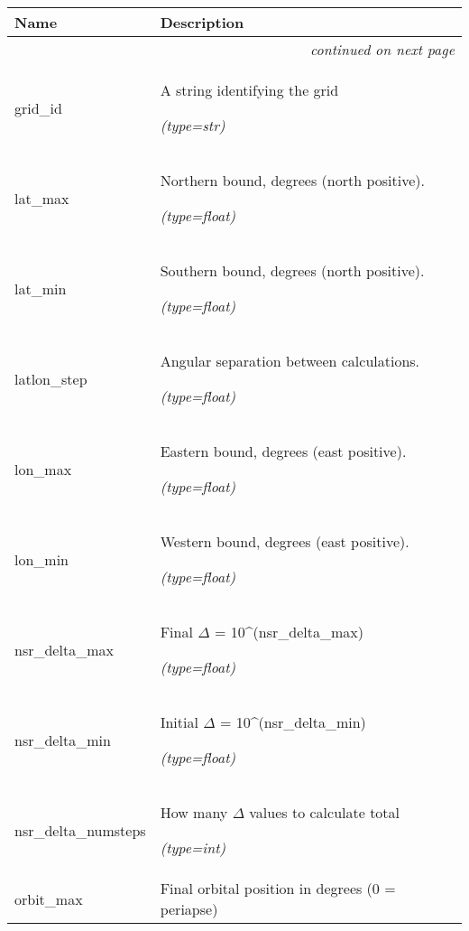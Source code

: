     \vspace{-1cm}
\hspace{\varindent}\begin{longtable}{|p{\varnamewidth}|p{\vardescrwidth}|l}
\cline{1-2}
\cline{1-2} \centering \textbf{Name} & \centering \textbf{Description}& \\
\cline{1-2}
\endhead\cline{1-2}\multicolumn{3}{r}{\small\textit{continued on next page}}\\\endfoot\cline{1-2}
\endlastfoot\raggedright g\-r\-i\-d\-\_\-i\-d\- & \raggedright A string identifying the grid

            {\it (type=str)}&\\
\cline{1-2}
\raggedright l\-a\-t\-\_\-m\-a\-x\- & \raggedright Northern bound, degrees (north positive).

            {\it (type=float)}&\\
\cline{1-2}
\raggedright l\-a\-t\-\_\-m\-i\-n\- & \raggedright Southern bound, degrees (north positive).

            {\it (type=float)}&\\
\cline{1-2}
\raggedright l\-a\-t\-l\-o\-n\-\_\-s\-t\-e\-p\- & \raggedright Angular separation between calculations.

            {\it (type=float)}&\\
\cline{1-2}
\raggedright l\-o\-n\-\_\-m\-a\-x\- & \raggedright Eastern bound, degrees (east positive).

            {\it (type=float)}&\\
\cline{1-2}
\raggedright l\-o\-n\-\_\-m\-i\-n\- & \raggedright Western bound, degrees (east positive).

            {\it (type=float)}&\\
\cline{1-2}
\raggedright n\-s\-r\-\_\-d\-e\-l\-t\-a\-\_\-m\-a\-x\- & \raggedright Final \(\Delta\) = 10{\textasciicircum}(nsr\_delta\_max)

            {\it (type=float)}&\\
\cline{1-2}
\raggedright n\-s\-r\-\_\-d\-e\-l\-t\-a\-\_\-m\-i\-n\- & \raggedright Initial \(\Delta\) = 10{\textasciicircum}(nsr\_delta\_min)

            {\it (type=float)}&\\
\cline{1-2}
\raggedright n\-s\-r\-\_\-d\-e\-l\-t\-a\-\_\-n\-u\-m\-s\-t\-e\-p\-s\- & \raggedright How many \(\Delta\) values to calculate total

            {\it (type=int)}&\\
\cline{1-2}
\raggedright o\-r\-b\-i\-t\-\_\-m\-a\-x\- & \raggedright Final orbital position in degrees (0 = periapse)


\end{longtable}
